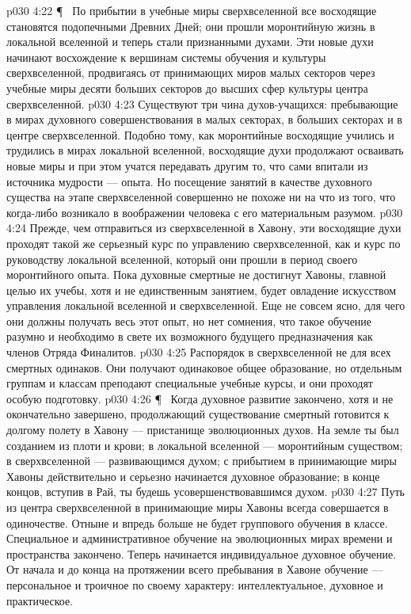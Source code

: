 \vs p030 4:22 \P\ \bibnobreakspace {} По прибытии в учебные миры сверхвселенной все восходящие становятся подопечными Древних Дней; они прошли моронтийную жизнь в локальной вселенной и теперь стали признанными духами. Эти новые духи начинают восхождение к вершинам системы обучения и культуры сверхвселенной, продвигаясь от принимающих миров малых секторов через учебные миры десяти больших секторов до высших сфер культуры центра сверхвселенной.
\vs p030 4:23 Существуют три чина духов\hyp{}учащихся: пребывающие в мирах духовного совершенствования в малых секторах, в больших секторах и в центре сверхвселенной. Подобно тому, как моронтийные восходящие учились и трудились в мирах локальной вселенной, восходящие духи продолжают осваивать новые миры и при этом учатся передавать другим то, что сами впитали из источника мудрости --- опыта. Но посещение занятий в качестве духовного существа на этапе сверхвселенной совершенно не похоже ни на что из того, что когда\hyp{}либо возникало в воображении человека с его материальным разумом.
\vs p030 4:24 Прежде, чем отправиться из сверхвселенной в Хавону, эти восходящие духи проходят такой же серьезный курс по управлению сверхвселенной, как и курс по руководству локальной вселенной, который они прошли в период своего моронтийного опыта. Пока духовные смертные не достигнут Хавоны, главной целью их учебы, хотя и не единственным занятием, будет овладение искусством управления локальной вселенной и сверхвселенной. Еще не совсем ясно, для чего они должны получать весь этот опыт, но нет сомнения, что такое обучение разумно и необходимо в свете их возможного будущего предназначения как членов Отряда Финалитов.
\vs p030 4:25 Распорядок в сверхвселенной не для всех смертных одинаков. Они получают одинаковое общее образование, но отдельным группам и классам преподают специальные учебные курсы, и они проходят особую подготовку.
\vs p030 4:26 \P\ \bibnobreakspace {} Когда духовное развитие закончено, хотя и не окончательно завершено, продолжающий существование смертный готовится к долгому полету в Хавону --- пристанище эволюционных духов. На земле ты был созданием из плоти и крови; в локальной вселенной --- моронтийным существом; в сверхвселенной --- развивающимся духом; с прибытием в принимающие миры Хавоны действительно и серьезно начинается духовное образование; в конце концов, вступив в Рай, ты будешь усовершенствовавшимся духом.
\vs p030 4:27 Путь из центра сверхвселенной в принимающие миры Хавоны всегда совершается в одиночестве. Отныне и впредь больше не будет группового обучения в классе. Специальное и административное обучение на эволюционных мирах времени и пространства закончено. Теперь начинается  индивидуальное духовное обучение. От начала и до конца на протяжении всего пребывания в Хавоне обучение --- персональное и троичное по своему характеру: интеллектуальное, духовное и практическое.
